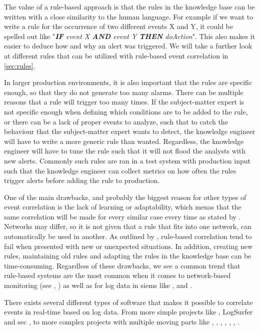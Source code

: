 The value of a rule-based approach is that the rules in the knowledge base can be written with a close similarity to the human language. For example if we want to write a rule for the occurrence of two different events X and Y, it could be spelled out like "\textit{\textbf{IF} event X \textbf{AND} event Y \textbf{THEN} doAction}". This also makes it easier to deduce how and why an alert was triggered. We will take a further look at different rules that can be utilized with rule-based event correlation in \cref{sec:rules}.

In larger production environments, it is also important that the rules are specific enough, so that they do not generate too many alarms.
There can be multiple reasons that a rule will trigger too many times. If the subject-matter expert is not specific enough when defining which conditions are to be added to the rule, or there can be a lack of proper events to analyze, such that to catch the behaviour that the subject-matter expert wants to detect, the knowledge engineer will have to write a more generic rule than wanted. Regardless, the knowledge engineer will have to tune the rule such that it will not flood the analysts with new alerts. Commonly such rules are ran in a test system with production input such that the knowledge engineer can collect metrics on how often the rules trigger alerts before adding the rule to production.

One of the main drawbacks, and probably the biggest reason for other types of event correlation is the lack of learning or adaptability, which menas that the same correlation will be made for every similar case every time as stated by \textcite{meira1997model}. Networks may differ, so it is not given that a rule that fits into one network, can automatically be used in another. As outlined by \textcite{lewis_1993}, rule-based correlation tend to fail when presented with new or unexpected situations. In addition, creating new rules, maintaining old rules and adapting the rules in the knowledge base can be time-consuming.
Regardless of these drawbacks, we see a common trend that rule-based systems are the most common when it comes to network-based monitoring (see \textcite{Suricata49:online}, \textcite{SnortNet49:online}) as well as for log data in \acrshort{siem}s like \textcite{Splunk}, \textcite{OSSEC} and \textcite{OSSIM}.

There exists several different types of software that makes it possible to correlate events in real-time based on log data. From more simple projects like \textcite{swatchdog}, LogSurfer \cite{thompson_2017} and \acrshort{sec} \cite{SEC}, to more complex projects with multiple moving parts like \textcite{Prelude:online}, \textcite{OSSEC}, \textcite{Wazuh:online}, \textcite{ApacheMe75:online}, \textcite{MozDef}, \textcite{OpenNMS}, \textcite{OSSIM}.

